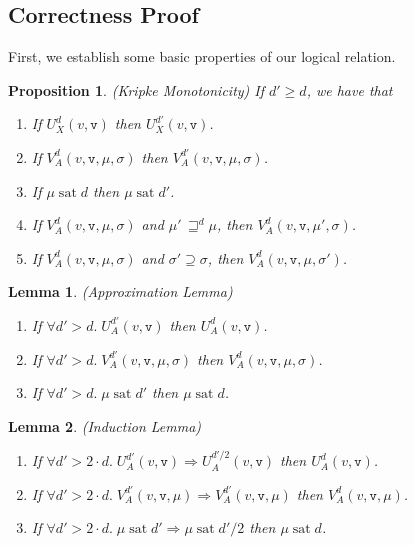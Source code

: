 \documentclass[nocopyrightspace,preprint]{sigplanconf}
\newcommand{\betterstate}[3]{{#2}\, {\sqsupseteq}^{#1} {#3}}
\renewcommand{\implies}{\Rightarrow}
\newcommand{\term}[1]{\ensuremath{\mathtt{{#1}}}}
\newcommand{\satisfy}[2]{{#1}\;\mathrm{sat}\;{#2}}
\newtheorem{prop}{Proposition}
\newtheorem{lemma}{Lemma}
\begin{document}
\subsection{Correctness Proof}

First, we establish some basic properties of our logical relation. 

\begin{prop}{(Kripke Monotonicity)}
If $d' \geq d$, we have that
\begin{enumerate}
\item If $U^d_X(v, \term{v})$ then $U^{d'}_X(v, \term{v})$. 
\item If $V^d_A(v, \term{v}, \mu, \sigma)$ then $V^{d'}_A(v, \term{v}, \mu, \sigma)$. 
\item If $\satisfy{\mu}{d}$ then $\satisfy{\mu}{d'}$. 
\item If $V^d_A(v, \term{v}, \mu, \sigma)$ and $\betterstate{d}{\mu'}{\mu}$, then $V^d_A(v, \term{v}, \mu',\sigma)$.
\item If $V^d_A(v, \term{v}, \mu, \sigma)$ and $\sigma' \supseteq \sigma$, then $V^d_A(v, \term{v}, \mu,\sigma')$.
\end{enumerate}
\end{prop}

\begin{lemma}{(Approximation Lemma)}
\begin{enumerate}
  \item If $\forall d' > d.\; U^{d'}_A(v, \term{v})$ then $U^d_A(v, \term{v})$. 
  \item If $\forall d' > d.\; V^{d'}_A(v, \term{v}, \mu, \sigma)$ then $V^d_A(v, \term{v}, \mu, \sigma)$. 
  \item If $\forall d' > d.\; \satisfy{\mu}{d'}$ then $\satisfy{\mu}{d}$. 
\end{enumerate}
\end{lemma}

\begin{lemma}{(Induction Lemma)}
\begin{enumerate}
  \item If $\forall d' > 2\cdot d.\; U^{d'}_A(v, \term{v}) \implies U^{d'/2}_A(v, \term{v})$ then $U^d_A(v, \term{v})$. 
  \item If $\forall d' > 2\cdot d.\; V^{d'}_A(v, \term{v}, \mu) \implies V^{d'}_A(v, \term{v}, \mu)$ then $V^d_A(v, \term{v}, \mu)$. 
  \item If $\forall d' > 2\cdot d.\; \satisfy{\mu}{d'} \implies \satisfy{\mu}{d'/2}$ then $\satisfy{\mu}{d}$. 
\end{enumerate}
\end{lemma}
\end{document}
